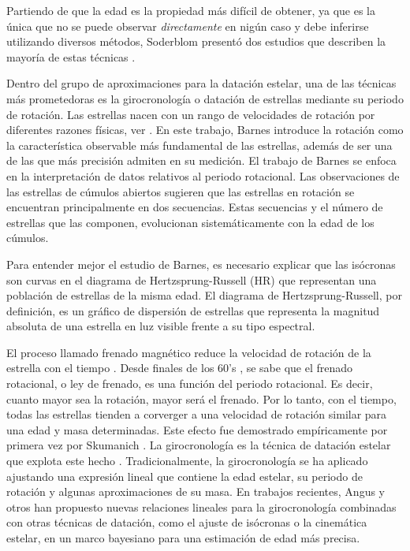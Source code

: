 Partiendo de que la edad es la propiedad más difícil de obtener, ya que es la única que no se puede observar \emph{directamente} en nigún caso y debe inferirse utilizando diversos métodos, Soderblom presentó dos estudios que describen la mayoría de estas técnicas \cite{Soderblom15, Soderblom10}.

Dentro del grupo de aproximaciones para la datación estelar, una de las técnicas más prometedoras es la girocronología o datación de estrellas mediante su periodo de rotación. Las estrellas nacen con un rango de velocidades de rotación por diferentes razones físicas, ver \cite{Barnes03}. En este trabajo, Barnes introduce la rotación como la característica observable más fundamental de las estrellas, además de ser una de las que más precisión admiten en su medición. El trabajo de Barnes se enfoca en la interpretación de datos relativos al periodo rotacional. Las observaciones de las estrellas de cúmulos abiertos sugieren que las estrellas en rotación se encuentran principalmente en dos secuencias. Estas secuencias y el número de estrellas que las componen, evolucionan sistemáticamente con la edad de los cúmulos.

Para entender mejor el estudio de Barnes, es necesario explicar que las isócronas son curvas en el diagrama de Hertzsprung-Russell (HR) que representan una población de estrellas de la misma edad. El diagrama de Hertzsprung-Russell, por definición, es un gráfico de dispersión de estrellas que representa la magnitud absoluta de una estrella en luz visible frente a su tipo espectral.

El proceso llamado frenado magnético reduce la velocidad de rotación de la estrella con el tiempo \cite{Schatzman62}. Desde finales de los 60's \cite{Belcher76, Kawaler88, Mestel68, Mestel87, Weber67}, se sabe que el frenado rotacional, o ley de frenado, es una función del periodo rotacional. Es decir, cuanto mayor sea la rotación, mayor será el frenado. Por lo tanto, con el tiempo, todas las estrellas tienden a corverger a una velocidad de rotación similar para una edad y masa determinadas. Este efecto fue demostrado empíricamente por primera vez por Skumanich \cite{Skumanich72}. La girocronología es la técnica de datación estelar que explota este hecho \cite{Barnes16, Soderblom15}. Tradicionalmente, la girocronología se ha aplicado ajustando una expresión lineal que contiene la edad estelar, su periodo de rotación y algunas aproximaciones de su masa. En trabajos recientes, Angus y otros \cite{Angus20} \cite{Angus19} han propuesto nuevas relaciones lineales para la girocronología combinadas con otras técnicas de datación, como el ajuste de isócronas o la cinemática estelar, en un marco bayesiano para una estimación de edad más precisa. 

